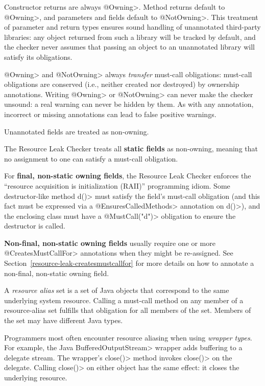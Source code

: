 Constructor returns are always \<@Owning>.
Method returns default to \<@Owning>,
and parameters and fields default to \<@NotOwning>. This treatment of parameter and
return types ensures sound handling of unannotated third-party libraries: any
object returned from such a library will be tracked by default, and the checker
never assumes that passing an object to an unannotated library will satisfy its obligations.

\<@Owning> and \<@NotOwning> always \emph{transfer} must-call obligations: must-call
obligations are conserved (i.e., neither created nor destroyed) by ownership annotations.
Writing \<@Owning> or \<@NotOwning> can never make the checker
unsound:  a real warning can never be hidden by them.
As with any annotation, incorrect or missing annotations can lead to false positive warnings.



Unannotated fields are treated as non-owning.

The Resource Leak Checker treats all \textbf{static fields} as non-owning, meaning that no assignment to one
can satisfy a must-call obligation.

For \textbf{final, non-static owning fields},
the Resource Leak Checker enforces the ``resource acquisition is
initialization (RAII)'' programming idiom.  Some
destructor-like method \<d()> must satisfy the field's must-call obligation
(and this fact must be expressed via a \<@EnsuresCalledMethods> annotation on \<d()>),
and the enclosing class must have a \<@MustCall("d")> obligation to
ensure the destructor is called.

\textbf{Non-final, non-static owning fields} usually require one or more \<@CreatesMustCallFor> annotations
when they might be re-assigned. See Section~\ref{resource-leak-createsmustcallfor} for
more details on how to annotate a non-final, non-static owning field.



A \emph{resource alias} set is a set of Java objects that
correspond to the same underlying system resource.
Calling a must-call method on any member of a resource-alias set
fulfills that obligation for all members of the set.
Members of the set may have different Java types.

Programmers most often encounter resource aliasing when using \emph{wrapper types}.
For example, the Java \<Buffered\-Output\-Stream> wrapper adds buffering to a
delegate stream.
The wrapper's \<close()> method invokes \<close()> on the delegate.  Calling
\<close()> on either object has the same effect:  it closes the underlying resource.

